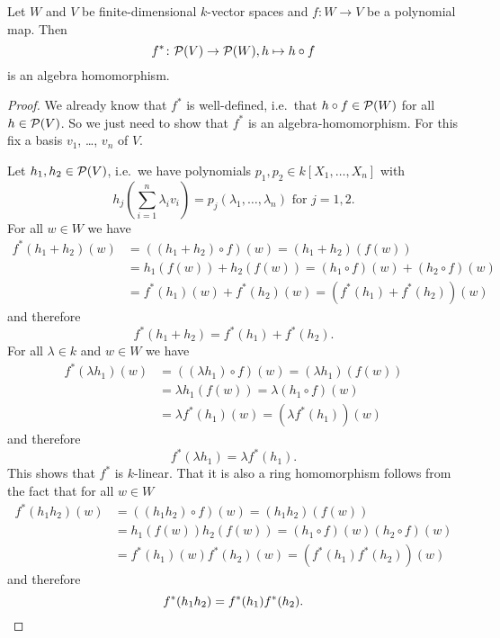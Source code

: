 \begin{lem}
  Let $W$ and $V$ be finite-dimensional $k$-vector spaces and $f \colon W \to V$ be a polynomial map. Then
  \[
            f^*
    \colon  \mathcal{P}(V)
    \to     \mathcal{P}(W),
            h
    \mapsto h \circ f
  \]
  is an algebra homomorphism.
\end{lem}
\begin{proof}
  We already know that $f^*$ is well-defined, i.e.\ that $h \circ f \in \mathcal{P}(W)$ for all $h \in \mathcal{P}(V)$.
  So we just need to show that $f^*$ is an algebra-homomorphism.
  For this fix a basis $v_1$, \dots, $v_n$ of $V$.
  
  Let $h_1, h_2\in \mathcal{P}(V)$, i.e.\ we have polynomials $p_1, p_2\in k[X_1, \dotsc, X_n]$ with
  \[
      h_j\left( \sum_{i=1}^n \lambda_i v_i \right)
    = p_j(\lambda_1, \dotsc, \lambda_n)
    \text{ for }
    j = 1, 2.
  \]
  For all $w \in W$ we have
  \begin{align*}
        f^*(h_1+h_2)(w)
    &=  ((h_1 + h_2) \circ f)(w)
     =  (h_1 + h_2)(f(w)) \\
    &=  h_1(f(w)) + h_2(f(w))
     =  (h_1 \circ f)(w) + (h_2 \circ f)(w) \\
    &=  f^*(h_1)(w) + f^*(h_2)(w)
     =  (f^*(h_1)+f^*(h_2))(w)
  \end{align*}
  and therefore
  \[
      f^*(h_1 + h_2)
    = f^*(h_1) + f^*(h_2).
  \]
  For all $\lambda \in k$ and $w \in W$ we have
  \begin{align*}
        f^*(\lambda h_1)(w)
    &=  ((\lambda h_1) \circ f)(w)
     =  (\lambda h_1)(f(w)) \\
    &=  \lambda h_1(f(w))
     =  \lambda (h_1 \circ f)(w) \\
    &=  \lambda f^*(h_1)(w)
     =  (\lambda f^*(h_1))(w)
  \end{align*}
  and therefore
  \[
      f^*(\lambda h_1)
    = \lambda f^*(h_1).
  \]
  This shows that $f^*$ is $k$-linear. That it is also a ring homomorphism follows from the fact that for all $w \in W$
  \begin{align*}
        f^*(h_1 h_2)(w)
    &=  ((h_1 h_2) \circ f)(w)
     =  (h_1 h_2)(f(w)) \\
    &=  h_1(f(w)) h_2(f(w))
     =  (h_1 \circ f)(w) (h_2 \circ f)(w) \\
    &=  f^*(h_1)(w) f^*(h_2)(w)
     =  (f^*(h_1) f^*(h_2))(w)
  \end{align*}
  and therefore
  \[
      f^*(h_1 h_2)
    = f^*(h_1) f^*(h_2).
    \qedhere
  \]
\end{proof}



